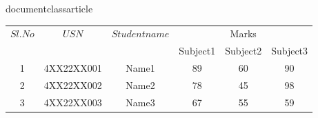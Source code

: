 documentclass{article} 
\usepackage[utf8]{inputenc} 
 
\begin{tabular}{|c|c|c|c|c|c|} 
\hline 
$Sl.No$ & $USN$&  $Student name$ &\multicolumn{3}{c|}{Marks}\\ 
\cline{4-6}  
& & & Subject1 & Subject2 &Subject3 \\ \hline
1& 4XX22XX001&Name1 &89 &60 &90 \\ \hline 
2& 4XX22XX002&Name2 &78 &45 &98 \\ \hline 
3& 4XX22XX003&Name3 &67 &55 &59 \\ \hline 
\end{tabular} 
 